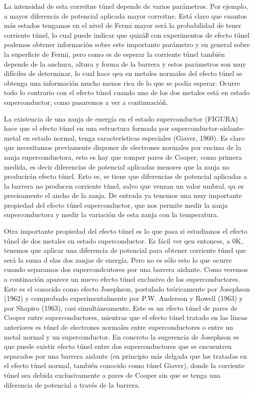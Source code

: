 La intensidad de esta correitne túnel depende de varios parámetros. Por ejemplo, a mayor diferencia de potencial aplicada mayor correitne. Está claro que cuantos más estados tengamos en el nivel de Fermi mayor será la probabilidad de tener corriente túnel, lo cual puede indicar que quizáß con experimentos de efecto túnel podemos obtener información sobre este importante parámetro y en general sobre la superficie de Fermi, pero como es de esperar la corriente túnel también depende de la anchura, altura y forma de la barrera y estos parámetros son muy difíciles de determinar, lo cual hace qeu en metales normales del efecto túnel se obtenga una información mucho menos rica de lo que se podía esperar. Ocurre todo lo contrario con el efecto túnel cuando uno de los dos metales está en estado superconductor, como pasaremos a ver a continuacióñ.

La existencia de una zanja de energía en el estado superconductor (FIGURA) hace que el efecto túnel en una estructura formada por superconductor-aislante-metal en estado normal, tenga características especiales (Giaver, 1960). Es claro que necesitamos previamente disponer de electrones normales por encima de la zanja superconductora, esto es hay que romper pares de Cooper, como primera medida, es decir diferencias de potencial aplicadas menores que la zanja no producirán efecto túnel. Esto es, se tiene que diferencias de potencial aplicadas a la barrera no producen corriente túnel, salvo que venzan un valor umbral, qu es precisamente el ancho de la zanja. De entrada ya tenemos una muy importante propiedad del efecto túnel superconductor, que nos permite medir la zanja superconductora y medir la variación de esta zanja con la temperatura.

Otra importante propiedad del efecto túnel es lo que pasa si estudiamos el efecto túnel de dos metales en estado superconductor. Es fácil ver qeu entonces, a 0K, tenemos que aplicar una diferencia de potencial para obtener corriente túnel que será la suma d elas dos zanjas de energía. Pero no es sólo esto lo que ocurre cuando separamos dos supercondcutores por una barrera aislante. Como veremos a continación aparece un nuevo efecto túnel exclusivo de los superconductores. Este es el conocido como efecto Josephson, postulado teóricamente por Josephson (1962) y comprobado experimentalmente por P.W. Anderson y Rowell (1963) y por Shapiro (1963), casi simultáneamente. Este es un efecto túnel de pares de Cooper entre superconductores, mientras que el efecto túnel tratado en las líneas anteriores es túnel de electrones normales entre superconductores o entre un metal normal y un superconductor. En concreto la sugerencia de Josephson es que puede existir efecto túnel entre dos superconductores que se encuentren separados por una barrera aislante (en principio más delgada que las tratadas en el efecto túnel normal, también conocido como túnel Giaver), donde la corriente túnel sea debida exclusivamente a pares de Cooper sin que se tenga una diferencia de potencial a través de la barrera.

